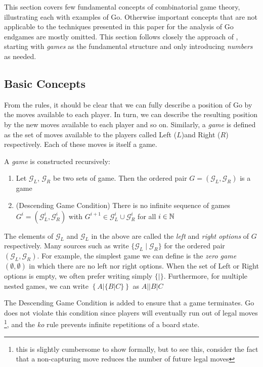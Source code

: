 \documentclass[../math194_paper.tex]{subfiles}
\begin{document}
This section covers few fundamental concepts of combinatorial game 
theory, illustrating each with examples of Go. Otherwise important concepts that 
are not applicable to the techniques presented in this paper for the analysis of Go
endgames are mostly omitted.
This section follows closely the approach of \cite{schleicher2006introduction}, starting 
with \textit{games} as the fundamental structure and only introducing \textit{numbers} as needed.

\subsection{Basic Concepts}

From the rules, it should be clear that we can fully describe a position of Go 
by the moves available to each player. In turn, we can describe the resulting 
position by the new moves available to each player and so on. Similarly, a 
\textit{game} is defined as the set of moves available to the players called
Left ($L $)and Right ($R$) respectively. Each of these moves is itself a game.

\begin{definition}[Game] 
    A \textit{game} is constructed recursively:
    \begin{enumerate}
        \item Let $\mathcal{G}_L$, $\mathcal{G}_R$ be two sets of game. Then the ordered pair 
        $G = (\mathcal{G}_L,\mathcal{G}_R)$ is a game  
        \item (Descending Game Condition) There is no infinite sequence of games  
        $G^i = (\mathcal{G}_L^i,\mathcal{G}_R^i)$ with $G^{i+1} \in \mathcal{G}_L^i \cup \mathcal{G}_R^i$ for all $i \in \mathbb{N}$
    \end{enumerate}
\end{definition}

The elements of $\mathcal{G}_L$ and $\mathcal{G}_L$ in the above are called the \textit{left} and \textit{right options}
of $G$ respectively. Many sources such as \cite{berlekamp1994mathematical} write 
$\{\mathcal{G}_L \mid \mathcal{G}_R \}$ for the ordered pair $(\mathcal{G}_L,\mathcal{G}_R)$. 
For example, the simplest game we can define is the \textit{zero game} $(\emptyset, \emptyset)$ in which there are no left nor right options. 
When the set of Left or Right options is empty, we often prefer writing simply $\{|\}$. Furthermore,
for multiple nested games, we can write $\left\{A | \{B | C\} \right\}$ as 
$A || B | C$

The Descending Game Condition is added to ensure that a game terminates. Go does not violate 
this condition since players will eventually run out of legal moves \footnote{this is slightly 
cumbersome to show formally, but to see this, consider the fact that a non-capturing move reduces 
the number of future legal moves},
and the \textit{ko} rule prevents infinite repetitions of a board state. \\
\end{document}
